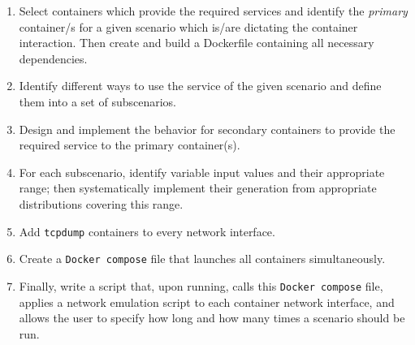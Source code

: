 \begin{enumerate}

\item Select containers which provide the required services and identify the \textit{primary} container/s for a given scenario which is/are dictating the container interaction. Then create and build a Dockerfile containing all necessary dependencies. 

 


\item Identify different ways to use the service of the given scenario and define them into a set of subscenarios. 

\item Design and implement the behavior for secondary containers to provide the required service to the primary container(s).

\item For each subscenario, identify variable input values and their appropriate range; then systematically implement their generation from appropriate distributions covering this range.
 
\item Add \texttt{tcpdump} containers to every network interface.

\item Create a \texttt{Docker compose} file that launches all containers simultaneously.%

\item Finally, write a script that, upon running, calls this \texttt{Docker compose} file, applies a network emulation script to each container network interface, and allows the user to specify how long and how many times a scenario should be run. %



\end{enumerate}

